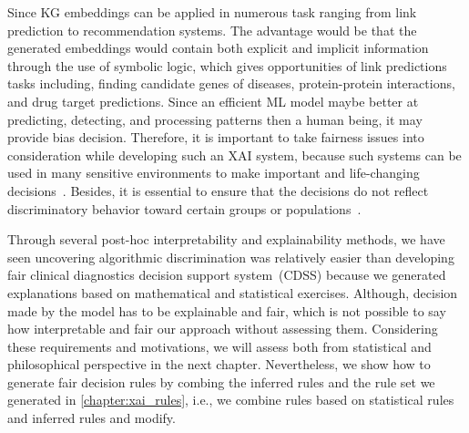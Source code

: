 \hspace*{3.5mm}Since KG embeddings can be applied in numerous task ranging from link prediction to recommendation systems. The advantage would be that the generated embeddings would contain both explicit and implicit information through the use of symbolic logic, which gives opportunities of link predictions tasks including, finding candidate genes of diseases, protein-protein interactions, and drug target predictions. Since an efficient ML model maybe better at predicting, detecting, and processing patterns then a human being, it may provide bias decision. Therefore, it is important to take fairness issues into consideration while developing such an XAI system, because such systems can be used in many sensitive environments to make important and life-changing decisions~\cite{stiglic2020interpretability}. Besides, it is essential to ensure that the decisions do not reflect discriminatory behavior toward certain groups or populations~\cite{mehrabi2019survey}. 

\hspace*{3.5mm} Through several post-hoc interpretability and explainability methods, we have seen uncovering algorithmic discrimination was relatively easier than developing fair clinical diagnostics decision support system~(CDSS) because we generated explanations based on mathematical and statistical exercises. Although, decision made by the model has to be explainable and fair, which is not possible to say how interpretable and fair our approach without assessing them. Considering these requirements and motivations, we will assess both from statistical and philosophical perspective in the next chapter. Nevertheless, we show how to generate fair decision rules by combing the inferred rules and the rule set we generated in \cref{chapter:xai_rules}, i.e., we combine rules based on statistical rules and inferred rules and modify.%

